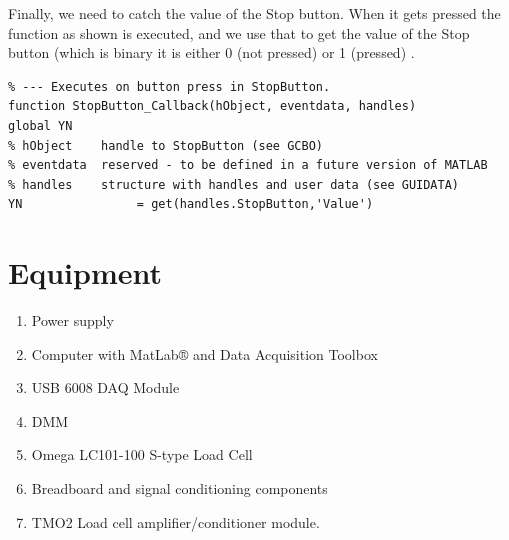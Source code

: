 \documentclass[12pt,letterpaper]{article}
\begin{document}
Finally, we need to catch the value of the Stop button. When it gets pressed the function as shown is executed, and we use that to get the value of the Stop button (which is binary it is either 0 (not pressed) or 1 (pressed) .

\begin{lstlisting}
% --- Executes on button press in StopButton.
function StopButton_Callback(hObject, eventdata, handles)
global YN
% hObject    handle to StopButton (see GCBO)
% eventdata  reserved - to be defined in a future version of MATLAB
% handles    structure with handles and user data (see GUIDATA)
YN                = get(handles.StopButton,'Value')
\end{lstlisting}


\section{Equipment}

\begin{enumerate}
\item Power supply
\item Computer with MatLab® and Data Acquisition Toolbox
\item USB 6008 DAQ Module
\item DMM
\item Omega LC101-100 S-type Load Cell 
\item Breadboard and signal conditioning components
\item TMO2 Load cell amplifier/conditioner module.
\end{enumerate}
\end{document}
